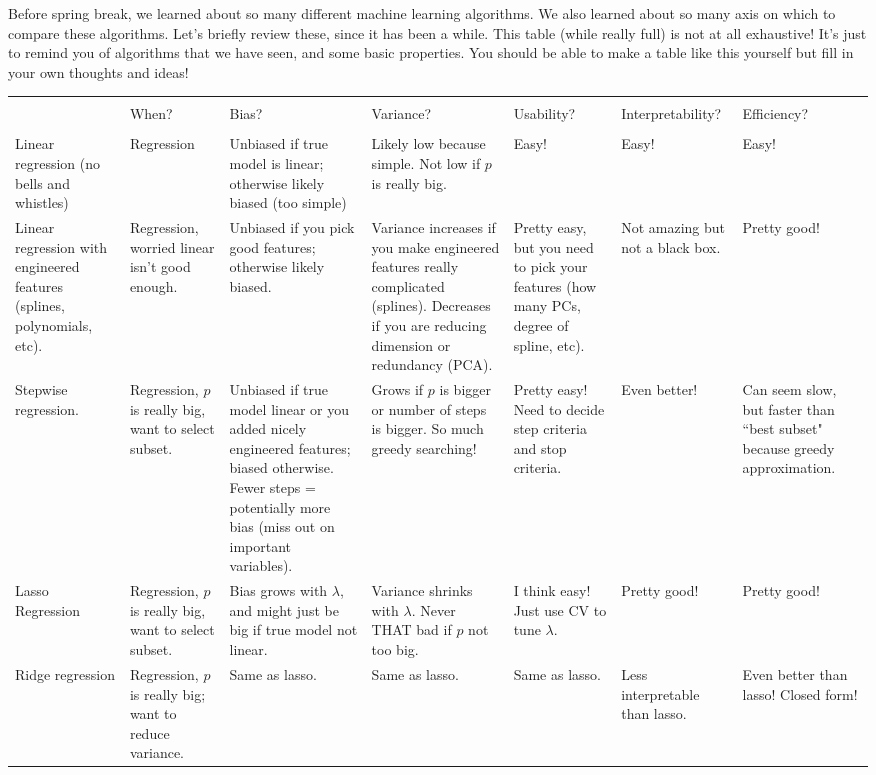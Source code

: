 Before spring break, we learned about so many different machine learning algorithms. We also learned about so many axis on which to compare these algorithms. Let's briefly review these, since it has been a while. This table (while really full) is not at all exhaustive! It's just to remind you of algorithms that we have seen, and some basic properties. You should be able to make a table like this yourself but fill in your own thoughts and ideas!

\begin{table}[H]
\scriptsize
\begin{tabularx}{\textwidth}{|X|X|X|X|X|X|X|}
\hline
&&&&&& \\ 
& When? & Bias? & Variance? & Usability? & Interpretability? & Efficiency? \\ 
&&&&&& \\ 
\hline 
Linear regression (no bells and whistles) & Regression & Unbiased if true model is linear; otherwise likely biased (too simple) & Likely low because simple. Not low if $p$ is really big. & Easy! & Easy! & Easy! \\
\hline 
Linear regression with engineered features (splines, polynomials, etc). & Regression, worried linear isn't good enough.  & Unbiased if you pick good features; otherwise likely biased. & Variance increases if you make engineered features really complicated (splines). Decreases if you are reducing dimension or redundancy (PCA). & Pretty easy, but you need to pick your features (how many PCs, degree of spline, etc). & Not amazing but not a black box. & Pretty good! \\
\hline
Stepwise regression.  & Regression, $p$ is really big, want to select subset.  & Unbiased if true model linear or you added nicely engineered features; biased otherwise. Fewer steps = potentially more bias (miss out on important variables). & Grows if $p$ is bigger or number of steps is bigger. So much greedy searching!& Pretty easy! Need to decide step criteria and stop criteria. & Even better! & Can seem slow, but faster than ``best subset" because greedy approximation.\\
\hline 
Lasso Regression & Regression, $p$ is really big, want to select subset. & Bias grows with $\lambda$, and might just be big if true model not linear. & Variance shrinks with $\lambda$. Never THAT bad if $p$ not too big. & I think easy! Just use CV to tune $\lambda$. & Pretty good! & Pretty good! \\ 
\hline  
Ridge regression  & Regression, $p$ is really big; want to reduce variance.  & Same as lasso. & Same as lasso. & Same as lasso. & Less interpretable than lasso. & Even better than lasso! Closed form! \\

\end{tabularx}
\end{table}
